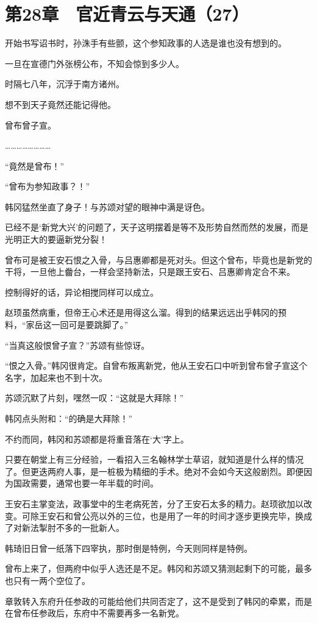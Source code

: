 \section{第28章　官近青云与天通（27）}

开始书写诏书时，孙洙手有些颤，这个参知政事的人选是谁也没有想到的。

一旦在宣德门外张榜公布，不知会惊到多少人。

时隔七八年，沉浮于南方诸州。

想不到天子竟然还能记得他。

曾布曾子宣。

……………………

“竟然是曾布！”

“曾布为参知政事？！”

韩冈猛然坐直了身子！与苏颂对望的眼神中满是讶色。

已经不是‘新党大兴’的问题了，天子这明摆着是等不及形势自然而然的发展，而是光明正大的要逼新党分裂！

曾布可是被王安石恨之入骨，与吕惠卿都是死对头。但这个曾布，毕竟也是新党的干将，一旦他上齤台，一样会坚持新法，只是跟王安石、吕惠卿肯定合不来。

控制得好的话，异论相搅同样可以成立。

赵顼虽然病重，但帝王心术还是用得这么溜。得到的结果远远出乎韩冈的预料，“家岳这一回可是要跳脚了。”

“当真这般恨曾子宣？”苏颂有些惊讶。

“恨之入骨。”韩冈很肯定。自曾布叛离新党，他从王安石口中听到曾布曾子宣这个名字，加起来也不到十次。

苏颂沉默了片刻，嘿然一叹：“这就是大拜除！”

韩冈点头附和：“的确是大拜除！”

不约而同，韩冈和苏颂都是将重音落在‘大’字上。

只要在朝堂上有三分经验，一看招入三名翰林学士草诏，就知道是什么样的情况了。但更迭两府人事，是一桩极为精细的手术。绝对不会如今天这般剧烈。即便因为国政需要，通常也要一年半载的时间。

王安石主掌变法，政事堂中的生老病死苦，分了王安石太多的精力。赵顼欲加以改变。可除王安石和曾公亮以外的三位，也是用了一年的时间才逐步更换完毕，换成了对新法掣肘不多的一批新人。

韩琦旧日曾一纸落下四宰执，那时倒是特例，今天则同样是特例。

曾布上来了，但两府中似乎人选还是不足。韩冈和苏颂又猜测起剩下的可能，最多也只有一两个空位了。

章敦转入东府升任参政的可能给他们共同否定了，这不是受到了韩冈的牵累，而是在曾布任参政后，东府中不需要再多一名新党。

